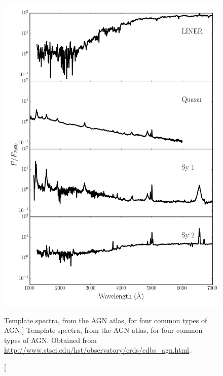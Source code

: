 \begin{figure}
\centering
\includegraphics[width=1.0\textwidth]{figures/01-intro/agn_templates.png}
\caption
[Template spectra, from the AGN atlas, for four common types of AGN.]
{
Template spectra, from the AGN atlas, for four common types of AGN.
Obtained from \url{http://www.stsci.edu/hst/observatory/crds/cdbs_agn.html}.
} 
\label{fig:agn_templates}
\end{figure} 




